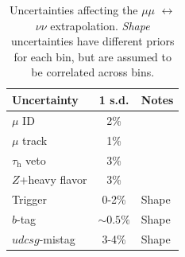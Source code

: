 \begin{table}[]
    \begin{center}
    \caption{Uncertainties affecting the $\mu\mu$ $\leftrightarrow$ $\nu\nu$ extrapolation. \emph{Shape} uncertainties have different priors for each bin, but are assumed to be correlated across bins.}
    \label{tab:mt:zmm_uncs}
    \begin{tabular}{lcl}
        Uncertainty & 1 s.d. & Notes \\
        \hline \hline
        $\mu$ ID  & 2\% & \\
        $\mu$ track  & 1\% & \\
        $\tau_\mathrm{h}$ veto  & 3\% & \\
        $Z$+heavy flavor & 3\% & \\
        Trigger & 0-2\% & Shape \\
        $b$-tag & $\sim0.5\%$ & Shape \\
        $udcsg$-mistag & 3-4\% & Shape \\
    \end{tabular}
\end{center}
\end{table}


